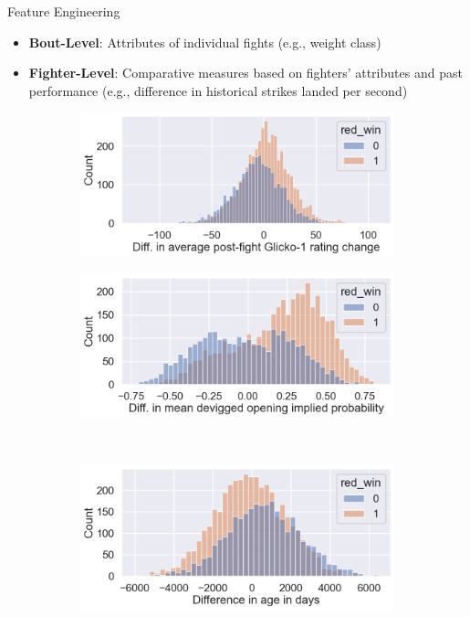 \documentclass[final]{beamer}
\newlength{\colwidth}
\begin{document}
\begin{frame}[t]
\begin{columns}[t]
\begin{column}{\colwidth}
\begin{block}{Feature Engineering}
\begin{itemize}
        \item \textbf{Bout-Level}: Attributes of individual fights (e.g., weight class)

        \item \textbf{Fighter-Level}: Comparative measures based on fighters' attributes and past performance (e.g., difference in historical strikes landed per second)
    \end{itemize}

    \begin{figure}
        \centering
        \captionsetup{justification=centering}
        \begin{subfigure}{.5\linewidth}
            \centering
            \includegraphics[width=\linewidth]{figures/glicko_1.png}
        \end{subfigure}
        \begin{subfigure}{.49\linewidth}
            \centering
            \includegraphics[width=\linewidth]{figures/opening_implied.png}
        \end{subfigure}\\
        \begin{subfigure}{.49\linewidth}
            \centering
            \includegraphics[width=\linewidth]{figures/age_days.png}

\end{subfigure}
\end{figure}
\end{block}
\end{column}
\end{columns}
\end{frame}
\end{document}
